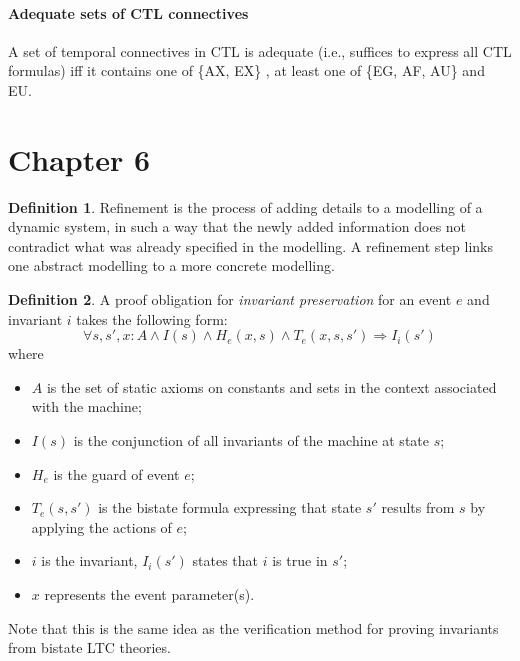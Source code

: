 \documentclass[10pt,a4paper]{article}
\theoremstyle{definition}
\newtheorem{definition}{Definition}[section]
\begin{document}
\paragraph{Adequate sets of CTL connectives}
A set of temporal connectives in CTL is adequate (i.e., suffices to express all CTL formulas) iff it contains one of \{AX, EX\} , at least one of \{EG, AF, AU\} and EU.

\section{Chapter 6}

\begin{definition}
Refinement is the process of adding details to a modelling of a dynamic system, in such a way that the newly added information does not contradict what was already specified in the modelling. A refinement step links one abstract modelling to a more concrete modelling.
\end{definition}

\begin{definition}
A proof obligation for \textit{invariant preservation} for an event $e$ and invariant $i$ takes the following form: $$\forall s,s',x: A \land I(s) \land H_e(x,s) \land T_e(x,s,s') \Rightarrow I_i(s')$$ where

\begin{itemize}
	\item $A$ is the set of static axioms on constants and sets in the context associated with the machine;
	\item $I(s)$ is the conjunction of all invariants of the machine at state $s$;
	\item $H_e$ is the guard of event $e$;
	\item $T_e(s,s')$  is the bistate formula expressing that state $s'$ results from $s$ by applying the actions of $e$;
	\item $i$ is the invariant, $I_i(s')$ states that $i$ is true in $s'$;
	\item $x$ represents the event parameter(s).
\end{itemize}

Note that this is the same idea as the verification method for proving invariants from bistate LTC theories.
\end{definition}
\end{document}
